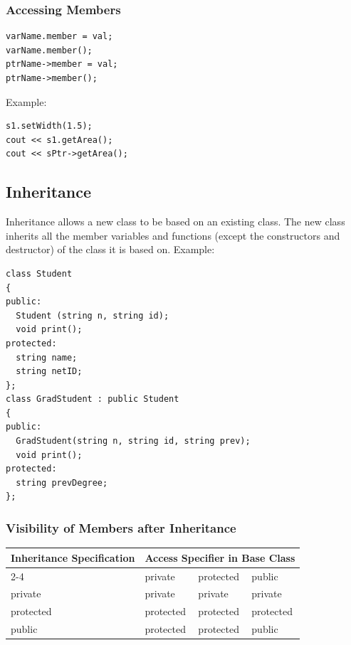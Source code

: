 \documentclass{article}
\begin{document}
\subsubsection*{Accessing Members}
\begin{verbatim}
varName.member = val;
varName.member();
ptrName->member = val;
ptrName->member();
\end{verbatim}
Example:
\begin{verbatim}
s1.setWidth(1.5);
cout << s1.getArea();
cout << sPtr->getArea();
\end{verbatim}

\subsection*{Inheritance}
Inheritance allows a new class to be based on an existing class. The new class inherits all the member variables and functions (except the constructors and destructor) of the class it is based on.
Example:
\begin{verbatim}
class Student
{
public:
  Student (string n, string id);
  void print();
protected:
  string name;
  string netID;
};
class GradStudent : public Student
{
public:
  GradStudent(string n, string id, string prev);
  void print();
protected:
  string prevDegree;
};
\end{verbatim}

\subsubsection*{Visibility of Members after Inheritance}
\begin{tabular}{|l|l|l|l|}
\hline
\multirow{2}{*}{Inheritance Specification} & \multicolumn{3}{c|}{Access Specifier in Base Class} \\
\cline{2-4}
 & private & protected & public \\
\hline
private & private & private & private \\
\hline
protected & protected & protected & protected \\
\hline
public & protected & protected & public \\
\hline
\end{tabular}
\end{document}
